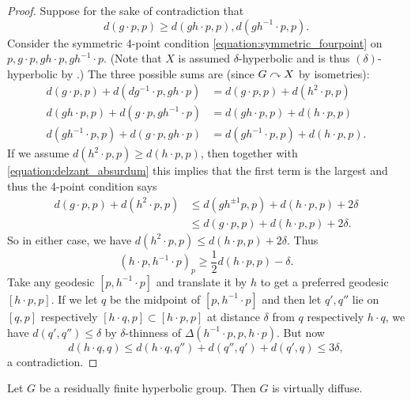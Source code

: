 \begin{proof}
    Suppose for the sake of contradiction that
    \begin{equation}
        \label{equation:delzant_absurdum}
        d(g \cdot p, p) \geq d(gh \cdot p, p), d(gh^{-1} \cdot p, p).
    \end{equation}
    Consider the symmetric 4-point condition \eqref{equation:symmetric_fourpoint} on $p, g \cdot p, gh \cdot p, gh^{-1} \cdot p$.
    (Note that $X$ is assumed $\delta$-hyperbolic and is thus $(\delta)$-hyperbolic by .)
    The three possible sums are (since $G \curvearrowright X$ by isometries):
    \begin{align*}
        d(g \cdot p, p) + d(dg^{-1} \cdot p, gh \cdot p)
        &= d(g \cdot p, p) + d(h^2 \cdot p, p) \\
        d(gh \cdot p, p) + d(g \cdot p, gh^{-1} \cdot p)
        &= d(gh \cdot p, p) + d(h \cdot p, p) \\
        d(gh^{-1} \cdot p, p) + d(g \cdot p, gh \cdot p)
        &= d(gh^{-1} \cdot p, p) + d(h \cdot p, p).
    \end{align*}
    If we assume $d(h^2 \cdot p, p) \geq d(h \cdot p, p)$, then together with \eqref{equation:delzant_absurdum} this implies that the first term is the largest and thus the 4-point condition says
    \begin{align*}
        d(g \cdot p, p) + d(h^2 \cdot p, p)
        & \leq d(g h^{\pm 1} p, p) + d(h \cdot p, p) + 2\delta \\
        & \leq d(g \cdot p, p) + d(h \cdot p, p) + 2\delta.
    \end{align*}
    So in either case, we have $d(h^2 \cdot p, p) \leq d(h \cdot p, p) + 2\delta$.
    Thus \[
        (h \cdot p, h^{-1} \cdot p)_p \geq \frac{1}{2} d(h \cdot p, p) - \delta.
    \]
    Take any geodesic $[p, h^{-1} \cdot p]$ and translate it by $h$ to get a preferred geodesic $[h \cdot p, p]$.
    If we let $q$ be the midpoint of $[p, h^{-1} \cdot p]$ and then let $q', q''$ lie on $[q, p]$ respectively $[h \cdot q, p] \subset [h \cdot p, p]$ at distance $\delta$ from $q$ respectively $h \cdot q$, we have $d(q', q'') \leq \delta$ by $\delta$-thinness of $\Delta(h^{-1} \cdot p, p, h \cdot p)$.
    But now \[
        d(h \cdot q, q) \leq d(h \cdot q, q'') + d(q'', q') + d(q', q) \leq 3\delta,
    \] a contradiction.

\end{proof}

\begin{corollary}
    Let $G$ be a residually finite hyperbolic group.
    Then $G$ is virtually diffuse.
\end{corollary}

